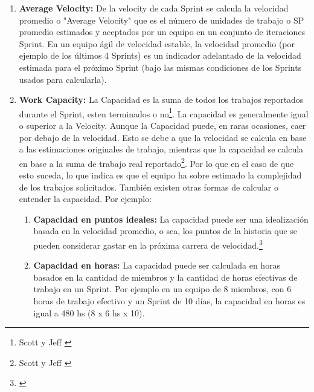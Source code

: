 \begin{enumerate}
\begin{enumerate}
  \item{\textbf{Value Velocity:} es una forma interesante para medir la productividad (sugerida por James Shore\footnote{\cite{James-Shore-2015}}) similar a la velocidad tradicional o velocidad de trabajo, excepto que se basa en estimaciones de valor de negocio (Business Value Point) hechas por el PO antes de la planeación.
  }
  
  \end{enumerate}

\item {\textbf{Average Velocity:} De la velocity de cada Sprint se calcula la velocidad promedio o "Average Velocity" que es el número de unidades de trabajo o SP promedio estimados y aceptados por un equipo en un conjunto de iteraciones Sprint. En un equipo ágil de velocidad estable, la velocidad promedio (por ejemplo de los últimos 4 Sprints) es un indicador adelantado de la velocidad estimada para el próximo Sprint (bajo las mismas condiciones de los Sprints usados para calcularla).}

\item {\textbf{Work Capacity:} La Capacidad es la suma de todos los trabajos reportados durante el Sprint, esten terminados o no\footnote{Scott y Jeff \cite{Scott-Jeff-2013}}. La capacidad es generalmente igual o superior a la Velocity. Aunque la Capacidad puede, en raras ocasiones, caer por debajo de la velocidad. Esto se debe a que la velocidad se calcula en base a las estimaciones originales de trabajo, mientras que la capacidad se calcula en base a la suma de trabajo real reportado\footnote{Scott y Jeff \cite{Scott-Jeff-2013}}. Por lo que en el caso de que esto suceda, lo que indica es que el equipo ha sobre estimado la complejidad de los trabajos solicitados. También existen otras formas de calcular o entender la capacidad. Por ejemplo:

  \begin{enumerate}
  
  \item {\textbf{Capacidad en puntos ideales:} La capacidad puede ser una idealización basada en la velocidad promedio, o sea, los puntos de la historia que se pueden considerar gastar en la próxima carrera de velocidad.\footnote{\cite{Satish-Thatte-2013}}}

  \item {\textbf{Capacidad en horas:} La capacidad puede ser calculada en horas basados en la cantidad de miembros y la cantidad de horas efectivas de trabajo en un Sprint. Por ejemplo en un equipo de 8 miembros, con 6 horas de trabajo efectivo y un Sprint de 10 días, la capacidad en horas es igual a 480 hs (8 x 6 hs x 10).}


\end{enumerate}}
\end{enumerate}
